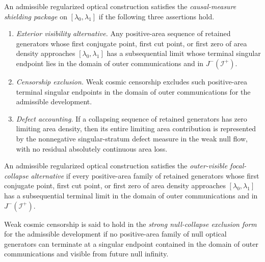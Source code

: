 \begin{definition}\label{def:CausalMeasureShieldingPackage}
An admissible regularized optical construction satisfies the \emph{causal-measure shielding package} on $[\lambda_0,\lambda_1]$ if the following three assertions hold.
\begin{enumerate}
    \item \emph{Exterior visibility alternative.} Any positive-area sequence of retained generators whose first conjugate point, first cut point, or first zero of area density approaches $[\lambda_0,\lambda_1]$ has a subsequential limit whose terminal singular endpoint lies in the domain of outer communications and in $J^-(\mathscr I^+)$.
    \item \emph{Censorship exclusion.} Weak cosmic censorship excludes such positive-area terminal singular endpoints in the domain of outer communications for the admissible development.
    \item \emph{Defect accounting.} If a collapsing sequence of retained generators has zero limiting area density, then its entire limiting area contribution is represented by the nonnegative singular-stratum defect measure in the weak null flow, with no residual absolutely continuous area loss.
\end{enumerate}
\end{definition}

\begin{definition}\label{def:OuterVisibleFocalCollapse}
An admissible regularized optical construction satisfies the \emph{outer-visible focal-collapse alternative} if every positive-area family of retained generators whose first conjugate point, first cut point, or first zero of area density approaches $[\lambda_0,\lambda_1]$ has a subsequential terminal limit in the domain of outer communications and in $J^-(\mathscr I^+)$.
\end{definition}

\begin{definition}\label{def:StrongWCCNullCollapseExclusion}
Weak cosmic censorship is said to hold in the \emph{strong null-collapse exclusion form} for the admissible development if no positive-area family of null optical generators can terminate at a singular endpoint contained in the domain of outer communications and visible from future null infinity.
\end{definition}


